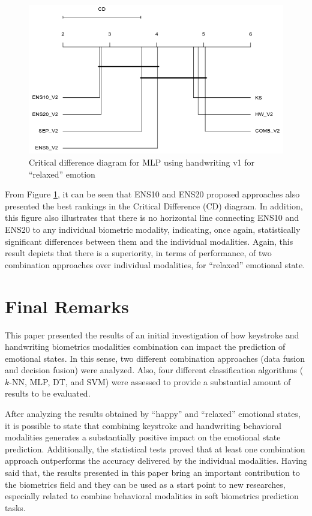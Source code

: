 \documentclass[conference]{IEEEtran}
\begin{document}
\begin{figure}[htbp]
  \centering
  \includegraphics[scale=0.5]{images/mlp_v2_relaxed.png}
  \caption{Critical difference diagram for MLP using handwriting v1 for ``relaxed'' emotion}
  \label{fig:cd-relaxed}
\end{figure}

From Figure \ref{fig:cd-relaxed}, it can be seen that ENS10 and ENS20 proposed approaches also presented
the best rankings in the Critical Difference (CD) diagram. In addition, this figure also illustrates that there is no horizontal line connecting ENS10 and ENS20 to any individual biometric modality, indicating, once again, statistically significant differences between them and the individual modalities. Again, this result depicts that there is a superiority, in terms of performance,  of two combination approaches over individual modalities, for ``relaxed'' emotional state. 

\section{Final Remarks}

This paper presented the results of an initial investigation of how keystroke and handwriting biometrics modalities combination can impact the prediction of emotional states. In this sense, two different combination approaches (data fusion and decision fusion) were analyzed. Also, four different classification algorithms ($k$-NN, MLP, DT, and SVM) were assessed to provide a substantial amount of results to be evaluated.

After analyzing the results obtained by ``happy''  and ``relaxed'' emotional states, it is possible to state that combining keystroke and handwriting behavioral modalities generates a substantially positive impact on the emotional state prediction.
Additionally, the statistical tests proved that at least one combination approach outperforms the accuracy delivered by the individual modalities.
Having said that, the results presented in this paper bring an important contribution to the biometrics field and they can be used as a start point to new researches, especially related to combine behavioral modalities in soft biometrics prediction tasks.
\end{document}
